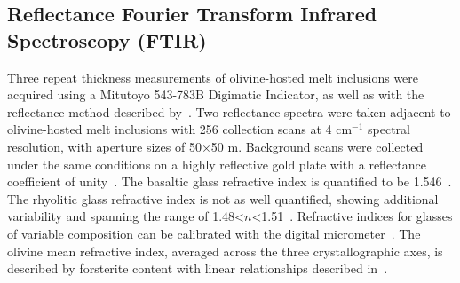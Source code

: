 \documentclass[draft]{agujournal2019}
\begin{document}
\subsection{Reflectance Fourier Transform Infrared Spectroscopy (FTIR)}
Three repeat thickness measurements of olivine-hosted melt inclusions were acquired using a Mitutoyo 543-783B Digimatic Indicator, as well as with the reflectance method described by~. Two reflectance spectra were taken adjacent to olivine-hosted melt inclusions with 256 collection scans at 4 cm$^{-1}$ spectral resolution, with aperture sizes of 50$\times$50 \textmu m. Background scans were collected under the same conditions on a highly reflective gold plate with a reflectance coefficient of unity~\cite{NicholsandWysoczanski2007}. The basaltic glass refractive index is quantified to be 1.546~\cite{KumagaiandKaneoka2003}. The rhyolitic glass refractive index is not as well quantified, showing additional variability and spanning the range of 1.48\textless $n$\textless 1.51~\cite{Trogeretal1959, Tamicetal2001}. Refractive indices for glasses of variable composition can be calibrated with the digital micrometer~\cite{DuncanandDasgupta2015, Tamicetal2001}. The olivine mean refractive index, averaged across the three crystallographic axes, is described by forsterite content with linear relationships described in~. 

\end{document}

